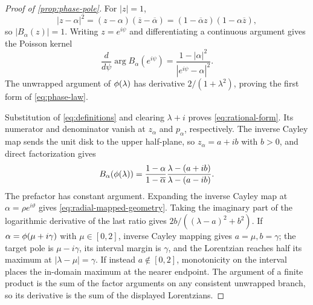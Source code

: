 \begin{proof}[Proof of \cref{prop:phase-pole}]
For $|z|=1$,
\begin{equation}
 |z-\alpha|^2=(z-\alpha)(\overline z-\overline\alpha)
 =(1-\overline\alpha z)(1-\alpha\overline z),
\end{equation}
so $|B_\alpha(z)|=1$.  Writing $z=e^{i\psi}$ and differentiating a
continuous argument gives the Poisson kernel
\begin{equation}
 \frac{d}{d\psi}\arg B_\alpha(e^{i\psi})
 =\frac{1-|\alpha|^2}{|e^{i\psi}-\alpha|^2}.
\end{equation}
The unwrapped argument of $\phi(\lambda)$ has derivative
$2/(1+\lambda^2)$, proving the first form of \cref{eq:phase-law}.

Substitution of \cref{eq:definitions} and clearing $\lambda+i$ proves
\cref{eq:rational-form}.  Its numerator and denominator vanish at
$z_\alpha$ and $p_\alpha$, respectively.  The inverse Cayley map sends the
unit disk to the upper half-plane, so $z_\alpha=a+ib$ with $b>0$, and direct
factorization gives
\begin{equation}
 B_\alpha(\phi(\lambda))
 =\frac{1-\alpha}{1-\overline\alpha}
   \frac{\lambda-(a+ib)}{\lambda-(a-ib)}.
\end{equation}
The prefactor has constant argument.  Expanding the inverse Cayley map at
$\alpha=\rho e^{i\vartheta}$ gives \cref{eq:radial-mapped-geometry}.  Taking
the imaginary part of the logarithmic derivative of the last ratio gives
$2b/((\lambda-a)^2+b^2)$.  If
$\alpha=\phi(\mu+i\gamma)$ with $\mu\in[0,2]$, inverse Cayley mapping gives
$a=\mu,b=\gamma$; the target pole is $\mu-i\gamma$, its interval margin is
$\gamma$, and the Lorentzian reaches half its maximum at
$|\lambda-\mu|=\gamma$.  If instead $a\notin[0,2]$, monotonicity on the
interval places the in-domain maximum at the nearer endpoint.  The argument
of a finite product is the sum of
the factor arguments on any consistent unwrapped branch, so its derivative is
the sum of the displayed Lorentzians.
\end{proof}

